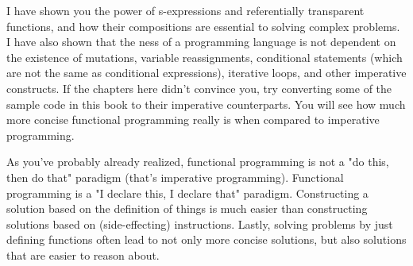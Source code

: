 I have shown you the power of s-expressions and referentially transparent functions, and how their 
compositions are essential to solving complex problems. I have also shown that the ness
of a programming language is not dependent on the existence of mutations, variable reassignments, conditional statements 
(which are not the same as conditional expressions), iterative loops, and other imperative constructs. If the chapters here didn't convince you, 
try converting some of the sample code in this book to their imperative counterparts. You will see how much more concise functional programming really
is when compared to imperative programming.

As you've probably already realized, functional programming is not a "do this, then do that" paradigm  (that's imperative programming). 
Functional programming is a "I declare this, I declare that" paradigm. Constructing a solution based on the definition of things is much easier than
constructing solutions based on (side-effecting) instructions. Lastly, solving problems by just defining functions often lead to not only more concise solutions, but also solutions that are easier to reason about.